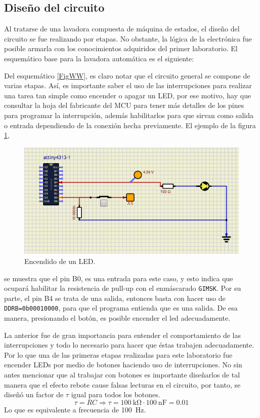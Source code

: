 \subsection*{Diseño del circuito}

Al tratarse de una lavadora compuesta de máquina de estados, el diseño del circuito se fue realizando por etapas. No obstante, la lógica de la electrónica fue posible armarla con los conocimientos adquiridos del primer laboratorio. El esquemático base para la lavadora automática es el siguiente:
 
Del esquemático \ref{FigWW}, es claro notar que el circuito general se compone de varias etapas. Así, es importante saber el uso de las interrupciones para realizar una tarea tan simple como encender o apagar un LED, por ese motivo, hay que consultar la hoja del fabricante del MCU para tener más detalles de los pines para programar la interrupción, además habilitarlos para que sirvan como salida o entrada dependiendo de la conexión hecha previamente. El ejemplo de la figura \ref{fig11},
    \begin{figure}[H]
        \centering
        \includegraphics[width=.7\linewidth]{Imagenes/5.1.png}
        \caption{Encendido de un LED.}
        \label{fig11}
    \end{figure}
se muestra que el pin B0, es una entrada para este caso, y esto indica que ocupará habilitar la resistencia de pull-up con el enmáscarado \texttt{GIMSK}. Por su parte, el pin B4 se trata de una salida, entonces basta con hacer uso de \texttt{DDRB=0b00010000}, para que el programa entienda que es una salida. De esa manera, presionando el botón, es posible encender el led adecuadamente.\par
La anterior fue de gran importancia para entender el comportamiento de las interrupciones y todo lo necesario para hacer que éstas trabajen adecuadamente. Por lo que una de las primeras etapas realizadas para este laboratorio fue encender LEDs por medio de botones haciendo uso de interrupciones. No sin antes mencionar que al trabajar con botones es importante diseñarlos de tal manera que el efecto rebote cause falsas lecturas en el circuito, por tanto, se diseñó un factor de $\tau$ igual para todos los botones.
\begin{equation}
\tau = RC \Rightarrow \tau = \SI{100}{\kilo\ohm} \cdot \SI{100}{\nano\farad} = 0.01
\end{equation}
Lo que es equivalente a frecuencia de \SI{100}{\Hz}.

